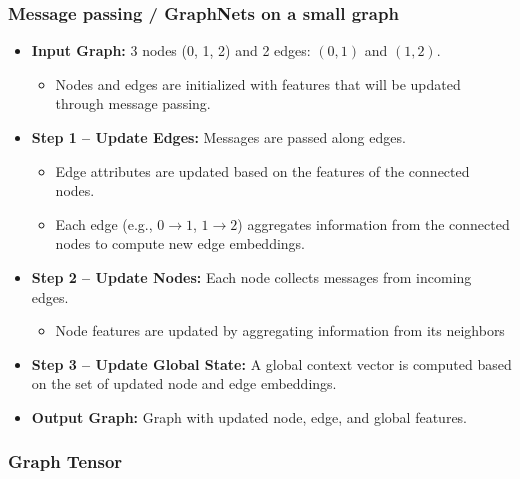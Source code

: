 \subsubsection{Message passing / GraphNets on a small graph}
\begin{example}
    \begin{itemize}
        \item \textbf{Input Graph:} 3 nodes (0, 1, 2) and 2 edges: $(0,1)$ and $(1,2)$.
        \begin{itemize}
            \item Nodes and edges are initialized with features that will be updated through message passing.
        \end{itemize}
    
        \item \textbf{Step 1 – Update Edges:} Messages are passed along edges.
        \begin{itemize}
            \item Edge attributes are updated based on the features of the connected nodes.
            \item Each edge (e.g., $0 \rightarrow 1$, $1 \rightarrow 2$) aggregates information from the connected nodes to compute new edge embeddings.
        \end{itemize}
    
        \item \textbf{Step 2 – Update Nodes:} Each node collects messages from incoming edges.
        \begin{itemize}
            \item Node features are updated by aggregating information from its neighbors
        \end{itemize}
    
        \item \textbf{Step 3 – Update Global State:} A global context vector is computed based on the set of updated node and edge embeddings.
    
        \item \textbf{Output Graph:} Graph with updated node, edge, and global features.
    \end{itemize}    
\end{example}
\newpage

\subsubsection{Graph Tensor}
\begin{example}
\end{example}
\newpage

